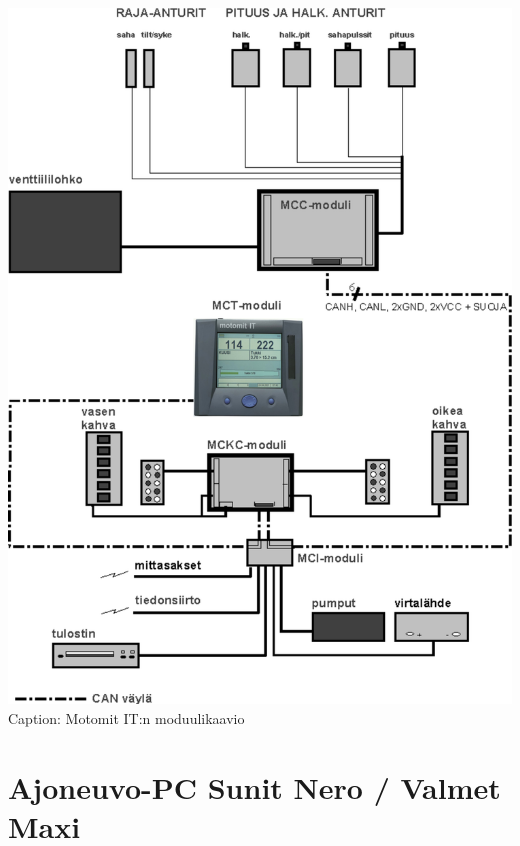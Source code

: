 \documentclass[]{article}
\begin{document}
\includegraphics[width=1.000\textwidth]{../pictures/motomit_kaavio.png}
Caption: Motomit IT:n moduulikaavio

\section{Ajoneuvo-PC Sunit Nero / Valmet
Maxi}\label{ajoneuvo-pc-sunit-nero-valmet-maxi}
\end{document}
